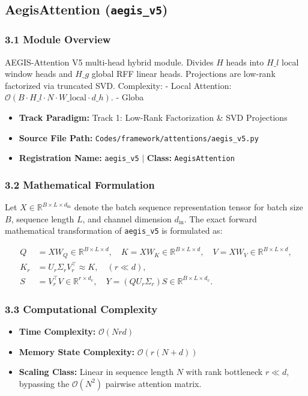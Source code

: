 \subsection{AegisAttention (\texttt{aegis\_v5})}
\label{sec:app_module_aegis\_v5}

\subsubsection*{3.1 Module Overview}
AEGIS-Attention V5 multi-head hybrid module.  Divides $H$ heads into $H\_l$ local window heads and $H\_g$ global RFF linear heads. Projections are low-rank factorized via truncated SVD.  Complexity:     - Local Attention: $\mathcal{O}(B \cdot H\_l \cdot N \cdot W\_{\text{local}} \cdot d\_h)$.     - Globa
\begin{itemize}
    \item \textbf{Track Paradigm:} Track 1: Low-Rank Factorization & SVD Projections
    \item \textbf{Source File Path:} \texttt{Codes/framework/attentions/aegis\_v5.py}
    \item \textbf{Registration Name:} \texttt{aegis\_v5} $\mid$ \textbf{Class:} \texttt{AegisAttention}
\end{itemize}

\subsubsection*{3.2 Mathematical Formulation}
Let $X \in \mathbb{R}^{B \times L \times d_{\text{in}}}$ denote the batch sequence representation tensor for batch size $B$, sequence length $L$, and channel dimension $d_{\text{in}}$. The exact forward mathematical transformation of \texttt{aegis\_v5} is formulated as:

\begin{align}
Q &= X W_Q \in \mathbb{R}^{B \times L \times d}, \quad K = X W_K \in \mathbb{R}^{B \times L \times d}, \quad V = X W_V \in \mathbb{R}^{B \times L \times d}, \\
K_r &= U_r \Sigma_r V_r^\top \approx K, \quad (r \ll d), \\
S &= V_r^\top V \in \mathbb{R}^{r \times d_v}, \quad Y = (Q U_r \Sigma_r) S \in \mathbb{R}^{B \times L \times d_v}.
\end{align}


\subsubsection*{3.3 Computational Complexity}
\begin{itemize}
    \item \textbf{Time Complexity:} $\mathcal{O}(N r d)$
    \item \textbf{Memory State Complexity:} $\mathcal{O}(r(N + d))$
    \item \textbf{Scaling Class:} Linear in sequence length $N$ with rank bottleneck $r \ll d$, bypassing the $\mathcal{O}(N^2)$ pairwise attention matrix.
\end{itemize}


